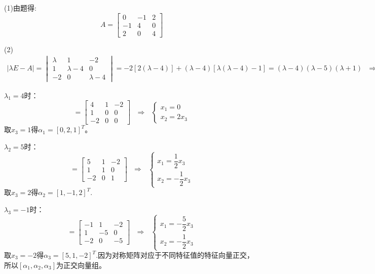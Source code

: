 \documentclass{article}
\begin{document}
\begin{jie}
(1)由题得:
\begin{equation*}
  A=
  \begin{bmatrix}
    0 & -1 & 2\\
    -1 & 4 & 0\\
    2 & 0 & 4
  \end{bmatrix}
\end{equation*}

(2)
\begin{align*}
|\lambda E-A|=
\begin{vmatrix}
    \lambda & 1 & -2\\
    1 & \lambda-4 & 0\\
    -2 & 0 & \lambda-4
\end{vmatrix}=-2[2(\lambda-4)]+(\lambda-4)[\lambda(\lambda-4)-1]=(\lambda-4)(\lambda-5)(\lambda+1)~~~\Rightarrow ~~~\lambda_1=4,\lambda_2=5,\lambda_3=-1
\end{align*}

$\lambda_1=4$时：
\begin{equation*}
[\lambda E-A]=
\begin{bmatrix}
  4 & 1 & -2\\
    1 & 0 & 0\\
    -2 & 0 & 0
\end{bmatrix}~~~\Rightarrow~~~
\begin{cases}
 x_1=0\\
 x_2=2x_3
\end{cases}
\end{equation*}
取$x_3=1$得$\alpha_1=[0,2,1]^T$。

$\lambda_2=5$时：
\begin{equation*}
[\lambda E-A]=
\begin{bmatrix}
  5 & 1 & -2\\
    1 & 1 & 0\\
    -2 & 0 & 1
\end{bmatrix}~~~\Rightarrow~~~
\begin{cases}
 x_1=\dfrac{1}{2}x_3\\[2mm]
 x_2=-\dfrac{1}{2}x_3
\end{cases}
\end{equation*}
取$x_3=2$得$\alpha_2=[1,-1,2]^T$.

$\lambda_3=-1$时：
\begin{equation*}
[\lambda E-A]=
\begin{bmatrix}
  -1 & 1 & -2\\
    1 & -5 & 0\\
    -2 & 0 & -5
\end{bmatrix}~~~\Rightarrow~~~
\begin{cases}
 x_1=-\dfrac{5}{2}x_3\\[2mm]
 x_2=-\dfrac{1}{2}x_3
\end{cases}
\end{equation*}
取$x_3=-2$得$\alpha_3=[5,1,-2]^T$.因为对称矩阵对应于不同特征值的特征向量正交，所以$[\alpha_1,\alpha_2,\alpha_3]$为正交向量组。


\end{jie}
\end{document}
